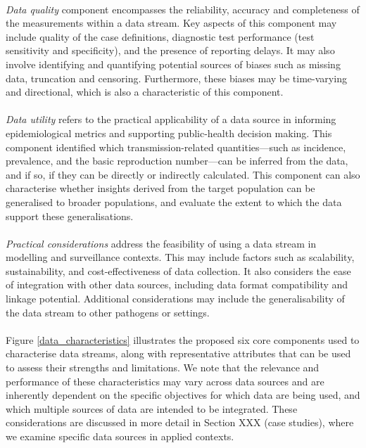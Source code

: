 \documentclass{article}
\begin{document}
\paragraph{} \textit{Data quality} component encompasses the reliability, accuracy and completeness of the measurements within a data stream. Key aspects of this component may include quality of the case definitions, diagnostic test performance (test sensitivity and specificity), and the presence of reporting delays. It may also involve identifying and quantifying potential sources of biases such as missing data, truncation and censoring. Furthermore, these biases may be time-varying and directional, which is also a characteristic of this component. 

\paragraph{}\textit{Data utility} refers to the practical applicability of a data source in informing epidemiological metrics and supporting public-health decision making. This component identified which transmission-related quantities---such as incidence, prevalence, and the basic reproduction number---can be inferred from the data, and if so, if they can be directly or indirectly calculated. This component can also characterise whether insights derived from the target population can be generalised to broader populations, and evaluate the extent to which the data support these generalisations.  

\paragraph{} \textit{Practical considerations} address the feasibility of using a data stream in modelling and surveillance contexts. This may include factors such as scalability, sustainability, and cost-effectiveness of data collection. It also considers the ease of integration with other data sources, including data format compatibility and linkage potential. Additional considerations may include the generalisability of the data stream to other pathogens or settings. 

\paragraph{}Figure \ref{data_characteristics} illustrates the proposed six core components used to characterise data streams, along with representative attributes that can be used to assess their strengths and limitations. We note that the relevance and performance of these characteristics may vary across data sources and are inherently dependent on the specific objectives for which data are being used, and which multiple sources of data are intended to be integrated. These considerations are discussed in more detail in Section XXX (case studies), where we examine specific data sources in applied contexts.  
\end{document}
